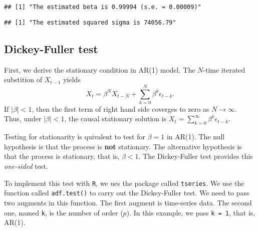 \documentclass[
  12pt,
]{article}
\newenvironment{Shaded}{\begin{snugshade}}{\end{snugshade}}
\newcommand{\KeywordTok}[1]{\textcolor[rgb]{0.13,0.29,0.53}{\textbf{#1}}}
\newcommand{\NormalTok}[1]{#1}
\newcommand{\OperatorTok}[1]{\textcolor[rgb]{0.81,0.36,0.00}{\textbf{#1}}}
\newcommand{\StringTok}[1]{\textcolor[rgb]{0.31,0.60,0.02}{#1}}
\begin{document}
\begin{Shaded}
\end{Shaded}

\begin{verbatim}
## [1] "The estimated beta is 0.99994 (s.e. = 0.00009)"
\end{verbatim}

\begin{Shaded}
\end{Shaded}

\begin{verbatim}
## [1] "The estimated squared sigma is 74056.79"
\end{verbatim}

\hypertarget{dickey-fuller-test}{%
\subsection{Dickey-Fuller test}\label{dickey-fuller-test}}

First, we derive the stationary condition in AR(1) model. The \(N\)-time
iterated substition of \(X_{t-1}\) yields
\[ X_t = \beta^N X_{t-N} + \sum_{k = 0}^N \beta^k \epsilon_{t-k}. \] If
\(|\beta| < 1\), then the first term of right hand side coverges to zero
as \(N \to \infty\). Thus, under \(|\beta| < 1\), the causal stationary
solution is \(X_t = \sum_{k=0}^{\infty} \beta^k \epsilon_{t-k}\).

Testing for stationarity is quivalent to test for \(\beta = 1\) in
AR(1). The null hypothesis is that the process is \textbf{not}
stationary. The alternative hypothesis is that the process is
stationary, that is, \(\beta < 1\). The Dickey-Fuller test provides this
\emph{one-sided} test.

To implement this test with \texttt{R}, we ues the package called
\texttt{tseries}. We use the function called \texttt{adf.test()} to
carry out the Dickey-Fuller test. We need to pass two augments in this
function. The first augment is time-series data. The second one, named
\texttt{k}, is the number of order (\(p\)). In this example, we pass
\texttt{k\ =\ 1}, that is, AR(1).
\end{document}
